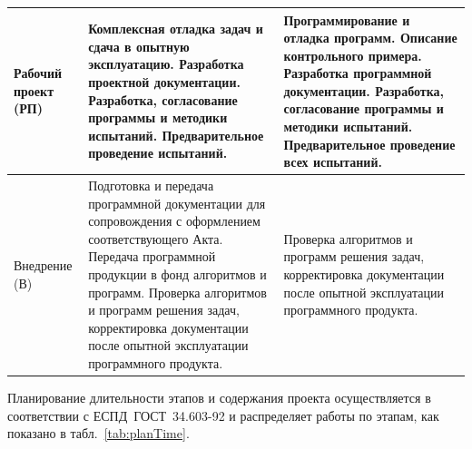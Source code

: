 {\begin{longtable}{|p{}|p{}|p{}|}
  \hline
    Рабочий проект (РП) & Комплексная отладка задач и сдача в опытную эксплуатацию. Разработка проектной документации. Разработка, согласование программы и методики испытаний. Предварительное проведение испытаний. & Программирование и отладка программ. Описание контрольного примера. Разработка программной документации. Разработка, согласование программы и методики испытаний. Предварительное проведение всех испытаний. \\

  \hline
    Внедрение (В) & Подготовка и передача программной документации для сопровождения с оформлением соответствующего Акта. Передача программной продукции в фонд алгоритмов и программ. Проверка алгоритмов и программ решения задач, корректировка документации после опытной эксплуатации программного продукта. & Проверка алгоритмов и программ решения задач, корректировка документации после опытной эксплуатации программного продукта. \\
  \hline
\end{longtable}
}
\normalsize

Планирование длительности этапов и содержания проекта осуществляется в соответствии с ЕСПД~ГОСТ~34.603-92 и распределяет работы по этапам, как показано в табл.~\ref{tab:planTime}.

